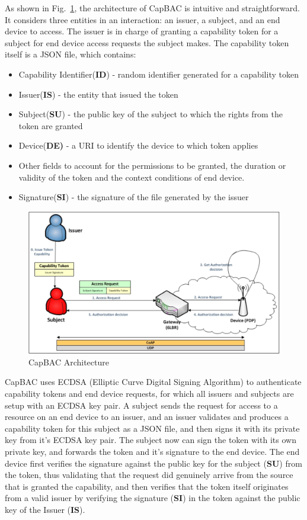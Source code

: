 As shown in Fig.~\ref{fig:capbac}, the architecture of CapBAC is intuitive and straightforward. It considers three entities in an interaction: an issuer, a subject, and an end device to access. The issuer is in charge of granting a capability token for a subject for end device access requests the subject makes. The capability token itself is a JSON file, which contains:
\begin{itemize}
\item Capability Identifier(\textbf{ID}) - random identifier generated for a capability token
\item Issuer(\textbf{IS}) - the entity that issued the token
\item Subject(\textbf{SU}) - the public key of the subject to which the rights from the token are granted
\item Device(\textbf{DE)} - a URI to identify the device to which token applies  
\item Other fields to account for the permissions to be granted, the duration or validity of the token and the context conditions of end device. 
\item Signature(\textbf{SI}) - the signature of the file generated by the issuer
\end{itemize}

\begin{figure}[h]
\centering
\includegraphics[scale = 0.2]{img/capBac}
\caption{CapBAC Architecture }
\label{fig:capbac}
\end{figure}

CapBAC uses ECDSA (Elliptic Curve Digital Signing Algorithm) to authenticate capability tokens and end device requests, for which all issuers and subjects are setup with an ECDSA key pair. A subject sends the request for access to a resource on an end device to an issuer, and an issuer validates and produces a capability token for this subject as a JSON file, and then signs it with its private key from it's ECDSA key pair. The subject now can sign the token with its own private key, and forwards the token and it's signature to the end device. The end device first verifies the signature against the public key for the subject (\textbf{SU}) from the token, thus validating that the request did genuinely arrive from the source that is granted the capability, and then verifies that the token itself originates from a valid issuer by verifying the signature (\textbf{SI}) in the token against the public key of the Issuer (\textbf{IS}).

